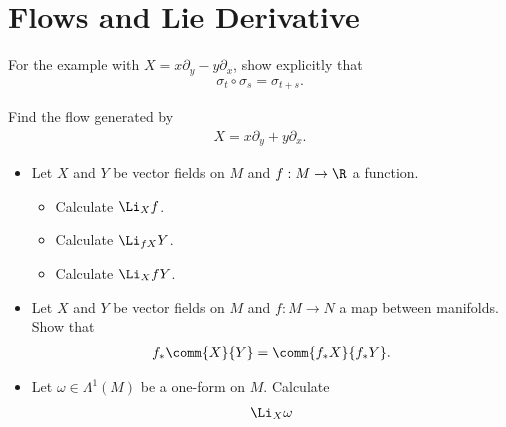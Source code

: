 \section{Flows and Lie Derivative}

\begin{Ebox}
  For the example with $X=x\partial_y -y\partial_x$, show explicitly that 
  \begin{align}
    \sigma_t\circ \sigma_s = \sigma_{t+s}.
  \end{align}
\end{Ebox}


\begin{Ebox}
  Find the flow generated by
  \begin{align}
    X = x\partial_y +y\partial_x.
  \end{align}
\end{Ebox}

\begin{Ebox}
  \begin{itemize}
  \item Let $X$ and $Y$ be vector fields on $M$ and $f:M\to\R$ a function.
    \begin{itemize}
    \item Calculate $\Li_{X}f$.
    \item Calculate $\Li_{fX}Y$.
    \item Calculate $\Li_{X}fY$.
    \end{itemize}
  \item  Let $X$ and $Y$ be vector fields on $M$ and $f:M\to N$ a map between manifolds. Show that
    \begin{align}
      f_*\comm{X}{Y} =\comm{f_*X}{f_*Y}.
    \end{align}
  \item Let $\omega\in\Lambda^1(M)$ be a one-form on $M$. Calculate
    \begin{align}
      \Li_X \omega
    \end{align}
  \end{itemize}
\end{Ebox}
